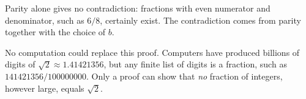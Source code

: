 Parity alone gives no contradiction: fractions with even numerator and denominator, such as $6/8$, certainly exist. The contradiction comes from parity together with the choice of $b$.

No computation could replace this proof. Computers have produced billions of digits of $\sqrt2\approx1.41421356$, but any finite list of digits is a fraction, such as $141421356/100000000$. Only a proof can show that \emph{no} fraction of integers, however large, equals $\sqrt2$.

